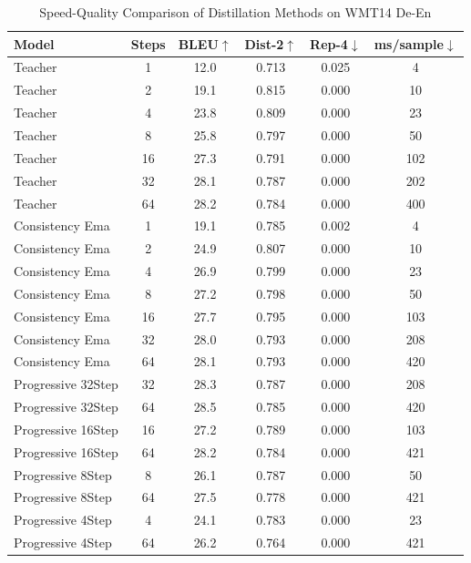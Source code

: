 \begin{table}[h]
\centering
\caption{Speed-Quality Comparison of Distillation Methods on WMT14 De-En}
\label{tab:distillation}
\begin{tabular}{lccccc}
\toprule
Model & Steps & BLEU$\uparrow$ & Dist-2$\uparrow$ & Rep-4$\downarrow$ & ms/sample$\downarrow$ \\
\midrule
Teacher & 1 & 12.0 & 0.713 & 0.025 & 4 \\
Teacher & 2 & 19.1 & 0.815 & 0.000 & 10 \\
Teacher & 4 & 23.8 & 0.809 & 0.000 & 23 \\
Teacher & 8 & 25.8 & 0.797 & 0.000 & 50 \\
Teacher & 16 & 27.3 & 0.791 & 0.000 & 102 \\
Teacher & 32 & 28.1 & 0.787 & 0.000 & 202 \\
Teacher & 64 & 28.2 & 0.784 & 0.000 & 400 \\
\midrule
Consistency Ema & 1 & 19.1 & 0.785 & 0.002 & 4 \\
Consistency Ema & 2 & 24.9 & 0.807 & 0.000 & 10 \\
Consistency Ema & 4 & 26.9 & 0.799 & 0.000 & 23 \\
Consistency Ema & 8 & 27.2 & 0.798 & 0.000 & 50 \\
Consistency Ema & 16 & 27.7 & 0.795 & 0.000 & 103 \\
Consistency Ema & 32 & 28.0 & 0.793 & 0.000 & 208 \\
Consistency Ema & 64 & 28.1 & 0.793 & 0.000 & 420 \\
\midrule
Progressive 32Step & 32 & 28.3 & 0.787 & 0.000 & 208 \\
Progressive 32Step & 64 & 28.5 & 0.785 & 0.000 & 420 \\
\midrule
Progressive 16Step & 16 & 27.2 & 0.789 & 0.000 & 103 \\
Progressive 16Step & 64 & 28.2 & 0.784 & 0.000 & 421 \\
\midrule
Progressive 8Step & 8 & 26.1 & 0.787 & 0.000 & 50 \\
Progressive 8Step & 64 & 27.5 & 0.778 & 0.000 & 421 \\
\midrule
Progressive 4Step & 4 & 24.1 & 0.783 & 0.000 & 23 \\
Progressive 4Step & 64 & 26.2 & 0.764 & 0.000 & 421 \\
\bottomrule
\end{tabular}
\end{table}